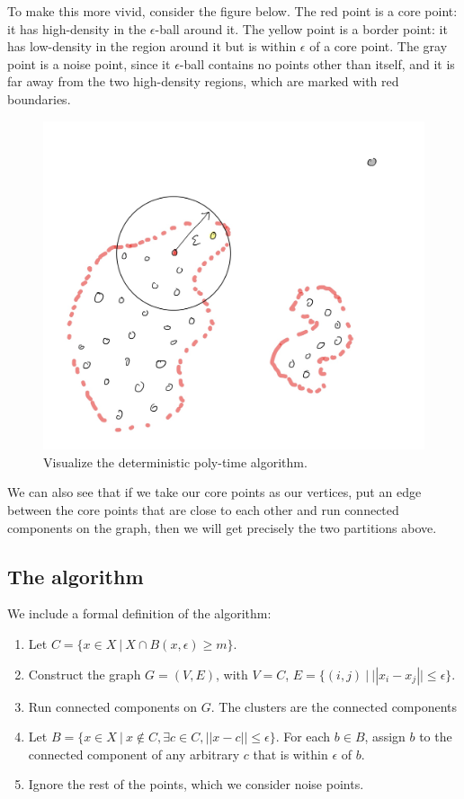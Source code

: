   To make this more vivid, consider the figure below. The red point is a core point:
  it has high-density in the $\epsilon$-ball around it. The yellow point is a border
  point: it has low-density in the region around it but is within $\epsilon$ of
  a core point. The gray point is a noise point, since it $\epsilon$-ball
  contains no points other than itself, and it is far away from the two high-density
  regions, which are marked with red boundaries.

  \begin{figure}[h]
  \centering
  \includegraphics[width=.7\linewidth]{chapter_2/files/dbscan.jpg}
  \caption{Visualize the deterministic poly-time algorithm. }
  \end{figure}

  We can also see that if we take our core points as our vertices, put an edge between
  the core points that are close to each other and run connected components on
  the graph, then we will get precisely the two partitions above.

  \subsection{The algorithm}

  We include a formal definition of the algorithm:

  \begin{enumerate}
  \item Let $C=\{x \in X \ | \ X \cap B(x, \epsilon) \geq m\}$.
  \item Construct the graph $G=(V,E)$, with $V=C$, $E=\{(i,j) \ | \ ||x_i-x_j|| \leq \epsilon\}$.
  \item Run connected components on $G$. The clusters are the connected components
  \item Let $B=\{x \in X \ | \ x \notin C, \exists c \in C, ||x-c|| \leq \epsilon\}$.
  For each $b \in B$, assign $b$ to the connected component of any arbitrary $c$
  that is within $\epsilon$ of $b$.
  \item Ignore the rest of the points, which we consider noise points.

  \end{enumerate}
  
